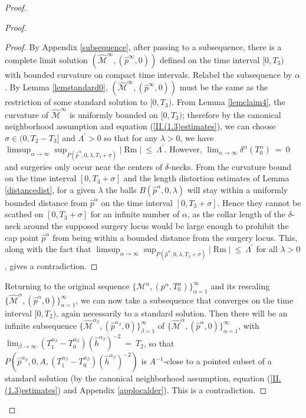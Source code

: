 \documentclass[12pt]{amsart}
\newcommand{\al}{\alpha}
\newcommand{\M}{{\mathcal M}}
\newcommand{\Rm}{\operatorname{Rm}}
\numberwithin{equation}{section}
\theoremstyle{plain}
\theoremstyle{definition}
\theoremstyle{remark}
\begin{document}
\begin{proof}
\begin{proof}
\begin{proof}
By Appendix \ref{subsequence}, after
passing to a subsequence, there is a complete limit solution
$(\widehat{\M}^\infty, (\hat{p}^\infty,0))$ defined on the time
interval $[0, T_3)$ with bounded curvature on compact time intervals.
Relabel the subsequence by $\al$. By Lemma \ref{lemstandard0}, 
$(\widehat{\M}^\infty, (\hat{p}^\infty,0))$ must be the same as the
restriction of some standard solution to $[0, T_3)$.
From Lemma \ref{lemclaim4}, the  curvature of $\widehat{\M}^\infty$ is uniformly
bounded on $[0, T_3)$; therefore by the canonical neighborhood assumption and equation
(\ref{II.(1.3)estimates}), 
we can choose $\sigma \in (0, T_2 - T_3]$ and $\Lambda^\prime > 0$ 
so that for any $\lambda > 0$,  we have
$\limsup_{\al \rightarrow \infty} 
\sup_{P(\hat{p}^{\al}, 0, \lambda, T_3 + \sigma)} |\Rm| \: \le \: \Lambda^\prime$.
However, $\lim_{\al \rightarrow \infty} 
\delta^\al (T_0^\al) \: = \: 0$ and surgeries only occur near the
centers of $\delta$-necks. From the curvature bound on the time
interval $[0, T_3 + \sigma]$ and the length distortion
estimates of Lemma \ref{distancedist}, for a given $\lambda$ the 
balls $B(\hat{p}^{\al}, 0, \lambda)$ will stay within 
a uniformly bounded distance from $\hat{p}^{\al}$ on the time interval
$[0, T_3 + \sigma]$. Hence they
cannot be scathed on $[0, T_3 + \sigma]$ for an infinite number of $\al$,
as the collar length of the $\delta$-neck around the supposed surgery locus
would be large enough to prohibit the cap point $\hat{p}^{\al}$ 
from being within a bounded
distance from the surgery locus.
This, along with the fact that $\limsup_{\al \rightarrow \infty} 
\sup_{P(\hat{p}^{\al}, 0, \lambda, T_3 + \sigma)} |\Rm| \: \le \: \Lambda^\prime$
for all $\lambda > 0$,
gives a contradiction.
\end{proof}

Returning to the original sequence 
$\{\M^\al, (p^\al,T_0^\al) \}_{\al = 1}^\infty$ and its rescaling
$\{ \widehat{\M}^\al, (\hat{p}^\al,0) \}_{\al = 1}^\infty$, we can now
take a subsequence that converges on the time interval $[0, T_2)$,
again necessarily to a standard solution.  Then there will be
an infinite subsequence 
$\{ \widehat{\M}^{\al_\beta}, (\hat{p}^{\al_\beta},0) \}_{\beta = 1}^\infty$
of 
$\{ \widehat{\M}^{\al}, (\hat{p}^{\al},0) \}_{\al = 1}^\infty$, 
with
$\lim_{\beta \rightarrow \infty} 
(T_1^{\al_\beta} - T_0^{\al_\beta})(\hat{h}^{\al_\beta})^{-2} \: = \: T_2$,
so that $P(\hat{p}^{\al_\beta}, 0, A, (T_1^{\al_\beta} - T_0^{\al_\beta})
(\hat{h}^{\al_\beta})^{-2})$
is $A^{-1}$-close to a pointed
subset of a standard solution (by the canonical
neighborhood assumption, equation
(\ref{II.(1.3)estimates}) and Appendix \ref{applocalder}). 
This is a contradiction.
\end{proof}


\end{proof}
\end{document}
